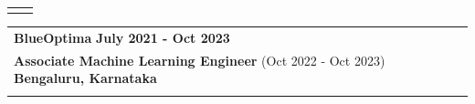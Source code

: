 \documentclass[a4paper,11pt]{article}
\begin{document}
\begin{tabularx}{\linewidth}{ @{}l r@{} }
\begin{minipage}[t]{\linewidth}
\begin{itemize}[nosep,after=\strut, leftmargin=1em, itemsep=4pt]
    \end{itemize}
\end{minipage}
\end{tabularx}

\begin{tabularx}{\linewidth}{ @{}l r@{} }
\textbf{\Large{BlueOptima}} \hfill \textbf{July 2021 - Oct 2023} \\[4pt]
\textbf{\Large{Associate Machine Learning Engineer}} (Oct 2022 - Oct 2023) \hfill \textbf{Bengaluru, Karnataka} \\[4pt]
\begin{minipage}[t]{\linewidth}
    \begin{itemize}[nosep,after=\strut, leftmargin=1em, itemsep=4pt]

\end{itemize}
\end{minipage}
\end{tabularx}
\end{document}
